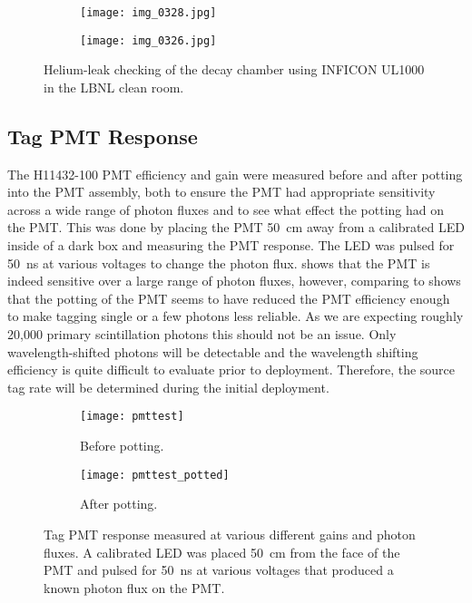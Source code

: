 \begin{figure}
\centering
\begin{subfigure}[b]{0.48\textwidth}
\centering
\texttt{[image: img\_0328.jpg]}
\caption{}
\label{fig:HeLeakCheckSetup}
\end{subfigure}%
\vspace{0.2cm}
\begin{subfigure}[b]{0.45\textwidth}
\centering
\texttt{[image: img\_0326.jpg]}
\caption{}
\label{fig:HeLeakCheckResult}
\end{subfigure}
\caption{Helium-leak checking of the decay chamber using INFICON UL1000 in the LBNL clean room.}
\label{fig:HeLeakCheck}
\end{figure}

\subsection{Tag PMT Response}
\label{sec:tagpmt}
The H11432-100 PMT efficiency and gain were measured before and after potting into the PMT assembly, both to ensure the PMT had appropriate sensitivity across a wide range of photon fluxes and to see what effect the potting had on the PMT. 
This was done by placing the PMT 50~cm away from a calibrated LED inside of a dark box and measuring the PMT response.
The LED was pulsed for 50~ns at various voltages to change the photon flux. 
 shows that the PMT is indeed sensitive over a large range of photon fluxes, however, comparing  to  shows that the potting of the PMT seems to have reduced the PMT efficiency enough to make tagging single or a few photons less reliable. 
As we are expecting roughly 20,000 primary scintillation photons this should not be an issue. 
Only wavelength-shifted photons will be detectable and the wavelength shifting efficiency is quite difficult to evaluate prior to deployment.
Therefore, the source tag rate will be determined during the initial deployment.

\begin{figure}
\begin{subfigure}{0.49\textwidth}
\caption{Before potting.}
\label{fig:pmttest}
\texttt{[image: pmttest]}
\end{subfigure}%
\begin{subfigure}{0.49\textwidth}
\caption{After potting.}
\label{fig:pmtafterpotting}
\texttt{[image: pmttest\_potted]}
\end{subfigure}
\caption{Tag PMT response measured at various different gains and photon fluxes. A calibrated LED was placed 50~cm from the face of the PMT and pulsed for 50~ns at various voltages that produced a known photon flux on the PMT.}
	\label{fig:calibratedled}
\end{figure}

